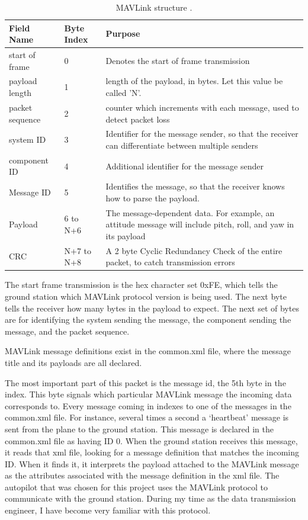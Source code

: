 \documentclass[12pt,journal,compsoc]{IEEEtran}
\begin{document}
\begin{table}[h!]
\centering

\begin{tabular}{|p{1.5cm}|p{0.9cm}|p{5cm}|}
\hline
Field Name & Byte Index & Purpose\\
\hline
start of frame & 0 & Denotes the start of frame transmission \\
\hline
payload length & 1 & length of the payload, in bytes. Let this value be called 'N'. \\
\hline
packet sequence & 2 & counter which increments with each message, used to detect packet loss \\
\hline
system ID & 3 & Identifier for the message sender, so that the receiver can differentiate between multiple senders\\
\hline
component ID & 4 & Additional identifier for the message sender\\
\hline
Message ID & 5 & Identifies the message, so that the receiver knows how to parse the payload.\\
\hline
Payload & 6 to N+6 & The message-dependent data. For example, an attitude message will include pitch, roll, and yaw in its payload\\
\hline
CRC & N+7 to N+8 & A 2 byte Cyclic Redundancy Check of the entire packet, to catch transmission errors\\
\hline
\end{tabular}
\caption{MAVLink structure \cite{MAVLink packet structure}.}
\end{table}

The start frame transmission is the hex character set 0xFE, which tells the ground station which MAVLink protocol version is being used. The next byte tells the receiver how many bytes in the payload to expect. The next set of bytes are for identifying the system sending the message, the component sending the message, and the packet sequence.

MAVLink message definitions exist in the common.xml file, where the message title and its payloads are all declared.

The most important part of this packet is the message id, the 5th byte in the index. This byte signals which particular MAVLink message the incoming data corresponds to. Every message coming in indexes to one of the messages in the common.xml file. For instance, several times a second a `heartbeat' message is sent from the plane to the ground station. This message is declared in the common.xml file as having ID 0. When the ground station receives this message, it reads that xml file, looking for a message definition that matches the incoming ID. When it finds it, it interprets the payload attached to the MAVLink message as the attributes associated with the message definition in the xml file. 
The autopilot that was chosen for this project uses the MAVLink protocol to communicate with the ground station. During my time as the data transmission engineer, I have become very familiar with this protocol.
\end{document}
